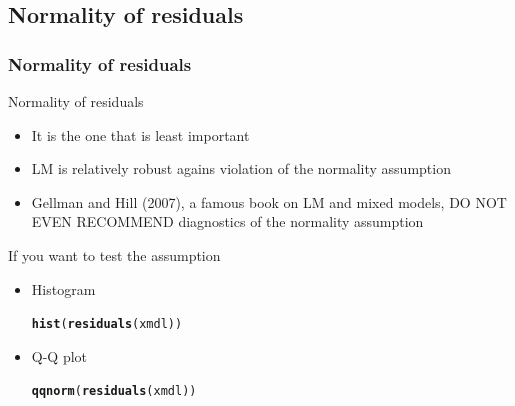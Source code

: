 \documentclass[10p]{beamer}\usepackage[]{graphicx}\usepackage[]{color}
\makeatletter
\newcommand{\hlstd}[1]{\textcolor[rgb]{0.345,0.345,0.345}{#1}}%
\newcommand{\hlkwd}[1]{\textcolor[rgb]{0.737,0.353,0.396}{\textbf{#1}}}%
\newenvironment{kframe}{%
 \def\at@end@of@kframe{}%
 \ifinner\ifhmode%
  \def\at@end@of@kframe{\end{minipage}}%
  \begin{minipage}{\columnwidth}%
 \fi\fi%
 \def\FrameCommand##1{\hskip\@totalleftmargin \hskip-\fboxsep
 \colorbox{shadecolor}{##1}\hskip-\fboxsep
     \hskip-\linewidth \hskip-\@totalleftmargin \hskip\columnwidth}%
 \MakeFramed {\advance\hsize-\width
   \@totalleftmargin\z@ \linewidth\hsize
   \@setminipage}}%
 {\par\unskip\endMakeFramed%
 \at@end@of@kframe}
\newenvironment{knitrout}{}{} %
\makeatother
\begin{document}
\subsection{Normality of residuals}
\begin{frame}
\frametitle{Normality of residuals}
Normality of residuals
\begin{itemize}
\item It is the one that is \alert{least important}
\item LM is relatively robust agains violation of the normality assumption
\item Gellman and Hill (2007), a famous book on LM and mixed models, DO NOT EVEN RECOMMEND diagnostics of the normality assumption
\end{itemize}

If you want to test the assumption
\begin{itemize}
\item Histogram
\begin{knitrout}\scriptsize
{}\color{fgcolor}\begin{kframe}
\begin{alltt}
\hlkwd{hist}\hlstd{(}\hlkwd{residuals}\hlstd{(xmdl))}
\end{alltt}
\end{kframe}
\end{knitrout}
\item Q-Q plot
\begin{knitrout}\scriptsize
{}\color{fgcolor}\begin{kframe}
\begin{alltt}
\hlkwd{qqnorm}\hlstd{(}\hlkwd{residuals}\hlstd{(xmdl))}
\end{alltt}
\end{kframe}
\end{knitrout}
\end{itemize}
\end{frame}
\end{document}
